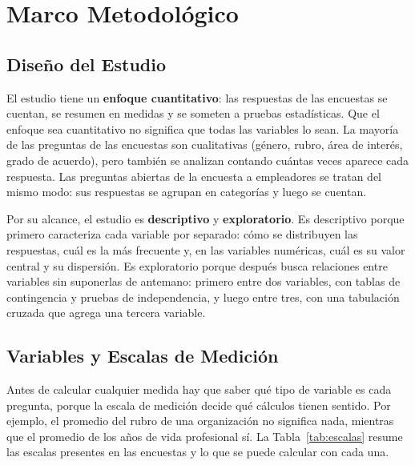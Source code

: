 \documentclass[12pt, a4paper]{article}
\begin{document}
\section{Marco Metodológico}

\subsection{Diseño del Estudio}

El estudio tiene un \textbf{enfoque cuantitativo}: las respuestas de las
encuestas se cuentan, se resumen en medidas y se someten a pruebas
estadísticas. Que el enfoque sea cuantitativo no significa que todas las
variables lo sean. La mayoría de las preguntas de las encuestas son
cualitativas (género, rubro, área de interés, grado de acuerdo), pero
también se analizan contando cuántas veces aparece cada respuesta. Las
preguntas abiertas de la encuesta a empleadores se tratan del mismo modo:
sus respuestas se agrupan en categorías y luego se cuentan.

Por su alcance, el estudio es \textbf{descriptivo} y
\textbf{exploratorio}. Es descriptivo porque primero caracteriza cada
variable por separado: cómo se distribuyen las respuestas, cuál es la más
frecuente y, en las variables numéricas, cuál es su valor central y su
dispersión. Es exploratorio porque después busca relaciones entre
variables sin suponerlas de antemano: primero entre dos variables, con
tablas de contingencia y pruebas de independencia, y luego entre tres,
con una tabulación cruzada que agrega una tercera variable.

\subsection{Variables y Escalas de Medición}

Antes de calcular cualquier medida hay que saber qué tipo de variable es
cada pregunta, porque la escala de medición decide qué cálculos tienen
sentido. Por ejemplo, el promedio del rubro de una organización no
significa nada, mientras que el promedio de los años de vida profesional
sí. La Tabla~\ref{tab:escalas} resume las escalas presentes en las
encuestas y lo que se puede calcular con cada una.
\end{document}
